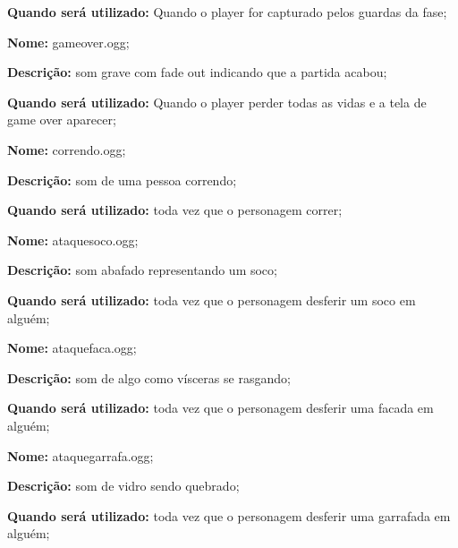 \begin{list}{}{}
\textbf{Quando será utilizado:} Quando o player for capturado pelos guardas da fase; \\

\item\textbf{Nome:} gameover.ogg;

\textbf{Descrição:} som grave com fade out indicando que a partida acabou;

\textbf{Quando será utilizado:} Quando o player perder todas as vidas e a tela de game over aparecer; \\


\item\textbf{Nome:} correndo.ogg;

\textbf{Descrição:} som de uma pessoa correndo;

\textbf{Quando será utilizado:} toda vez que o personagem correr; \\

\item\textbf{Nome:} ataquesoco.ogg;

\textbf{Descrição:} som abafado representando um soco;

\textbf{Quando será utilizado:} toda vez que o personagem desferir um soco em alguém; \\

\item\textbf{Nome:} ataquefaca.ogg;

\textbf{Descrição:} som de algo como vísceras se rasgando;

\textbf{Quando será utilizado:} toda vez que o personagem desferir uma facada em alguém; \\

\item\textbf{Nome:} ataquegarrafa.ogg;

\textbf{Descrição:} som de vidro sendo quebrado;

\textbf{Quando será utilizado:} toda vez que o personagem desferir uma garrafada em alguém;  \\
\end{list}

